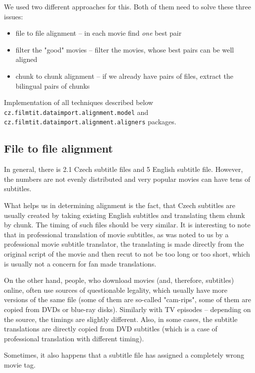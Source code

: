 We used two different approaches for this. Both of them need to solve these three issues:
\begin{itemize}
    \item file to file alignment -- in each movie find \emph{one} best pair
    \item filter the "good" movies -- filter the movies, whose best pairs can be well aligned
    \item chunk to chunk alignment -- if we already have pairs of files, extract the bilingual pairs of chunks 
\end{itemize}

Implementation of all techniques described below \texttt{cz.filmtit.dataimport.alignment.model} and \texttt{cz.filmtit.dataimport.alignment.aligners} packages.

\subsection{File to file alignment}
In general, there is 2.1 Czech subtitle files and 5 English subtitle file. However, the numbers are not evenly distributed and very popular movies can have tens of subtitles.

What helps us in determining alignment is the fact, that Czech subtitles are usually created by taking existing English subtitles and translating them chunk by chunk. The timing of such files should be very similar. It is interesting to note that in professional translation of movie subtitles, as was noted to us by a professional movie subtitle translator, the translating is made directly from the original script of the movie and then recut to not be too long or too short, which is usually not a concern for fan made translations. 

On the other hand, people, who download movies (and, therefore, subtitles) online, often use sources of questionable legality, which usually have more versions of the same file (some of them are so-called "cam-rips", some of them are copied from DVDs or blue-ray disks). Similarly with TV episodes -- depending on the source, the timings are slightly different. Also, in some cases, the subtitle translations are directly copied from DVD subtitles (which is a case of professional translation with different timing).

Sometimes, it also happens that a subtitle file has assigned a completely wrong movie tag.

